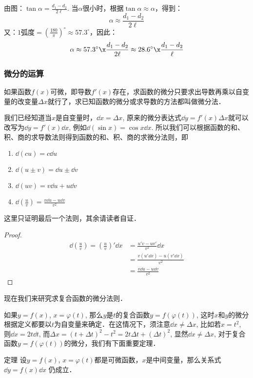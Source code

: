 \begin{solution}
由图：$\tan\alpha=\frac{d_1-d_2}{2\ell}$. 当$\alpha$很小时，根据$\tan\alpha\approx \alpha$，得到：
\[\alpha\approx \frac{d_1-d_2}{2\ell}\]
又：$1\text{弧度}=\left(\frac{180}{\pi}\right)^{\circ}\approx 57.3^{\circ}$，因此：
\[\alpha\approx 57.3^{\circ}\x \frac{d_1-d_2}{2\ell}\approx 28.6^{\circ}\x \frac{d_1-d_2}{\ell}\]
\end{solution}

\subsubsection{微分的运算}

如果函数$f(x)$可微，即导数$f'(x)$存在，求函数的微分只要求出导数再乘以自变量的改变量$\Delta x$就行了，求已知函数的微分或求导数的方法都叫做微分法．

我们已经知道当$x$是自变量时，$\dd x=\Delta x$, 原来的微分表达式$\dd y=f'(x)\Delta x$就可以改写为$\dd y=f'(x)\dd x$, 例如$\dd(\sin x)=\cos x \dd x$. 所以我们可以根据函数的和、积、商的求导数法则得到函数的和、积、商的求微分法则，即
\begin{enumerate}
    \item $\dd(cu)=c\dd u$
    \item $\dd(u\pm v)=\dd u\pm \dd v$
    \item $\dd(uv)=v\dd u+u\dd v$
    \item $\dd\left(\frac{u}{v}\right)=\frac{v\dd u-u\dd v}{v^2}$
\end{enumerate}
这里只证明最后一个法则，其余请读者自证．

\begin{proof}
\begin{align*}
\dd\left(\frac{u}{v}\right)=\left(\frac{u}{v}\right)'\dd x&=\frac{u'v-uv'}{v^2}\dd x\\
&=\frac{v(u'\dd x)-u(v'\dd x)}{v^2}\\
&=\frac{v\dd u-u\dd v}{v^2}
\end{align*}
\end{proof}


现在我们来研究求复合函数的微分法则．

如果$y=f(x)$, $x=\varphi (t)$, 那么$y$是$t$的复合函数$y=f(\varphi (t))$, 这时$x$和$y$的微分根据定义都要以$t$为自变量来确定．在这情况下，须注意$\dd x\ne \Delta x$, 比如若$x=t^2$, 则$\dd x=2t\dd t$, 而$\Delta x=(t+\Delta t)^2-t^2=2t\Delta t+(\Delta t)^2$, 显然$\dd x\ne \Delta x$, 对于复合函数$y=f(\varphi (t))$的微分，我们有下面重要定理．

\begin{blk}
    {定理} 设$y=f(x)$, $x=\varphi (t)$都是可微函数，$x$是中间变量，那么关系式
$\dd y=f (x) \dd x$
仍成立．
\end{blk}


